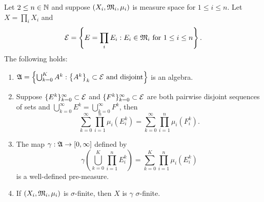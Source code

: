 \documentclass[a4paper]{article}
\renewcommand{\cupinfk}{\bigcup_{k=0}^\infty}
\renewcommand{\suminfk}{\sum_{k=0}^\infty}
\renewcommand{\seqinfk}[1]{\{ #1 \}_{k=0}^\infty}
\renewcommand{\cupk}{\bigcup_{k=0}}
\renewcommand{\sumk}{\sum_{k=0}}
\begin{document}
\begin{thm}
Let $2 \leq n \in \mathbb{N}$ and suppose $(X_i, \mathfrak{M}_i, \mu_i)$
is measure space for $1 \leq i \leq n$. Let
$X = \prod_i X_i$ and
\[
\mathcal{E} = \left\{ E = \prod_i E_i :
\text{$E_i \in \mathfrak{M}_i$ for $1 \leq i \leq n$} \right\}.
\]
The following holds:
\begin{enumerate}
\item $\afk = \left\{ \cupk^K A^k :
\text{$\left\{ A^k \right\}_k \subset \ecal$ and disjoint}
\right\}$ is an algebra.

\item Suppose $\seqinfk{E^k} \subset \ecal$ and
$\seqinfk{F^k} \subset \ecal$ are both pairwise disjoint sequences
of sets and $\cupinfk{E^k} = \cupinfk{F^k}$, then
\[
\suminfk \prod_{i=1}^n \mu_i(E_i^k) =
\suminfk \prod_{i=1}^n \mu_i(F_i^k).
\]

\item The map $\gamma: \mathfrak{A} \to [0, \infty]$ defined by
\[
\gamma \left( \cupk^K \prod_{i=1}^n E_i^k \right)
= \sumk^K \prod_{i=1}^n \mu_i(E_i^k)
\]
is a well-defined pre-measure.

\item If $(X_i, \mathfrak{M}_i, \mu_i)$ is $\sigma$-finite, then
$X$ is $\gamma$ $\sigma$-finite.
\end{enumerate}
\end{thm}
\end{document}
